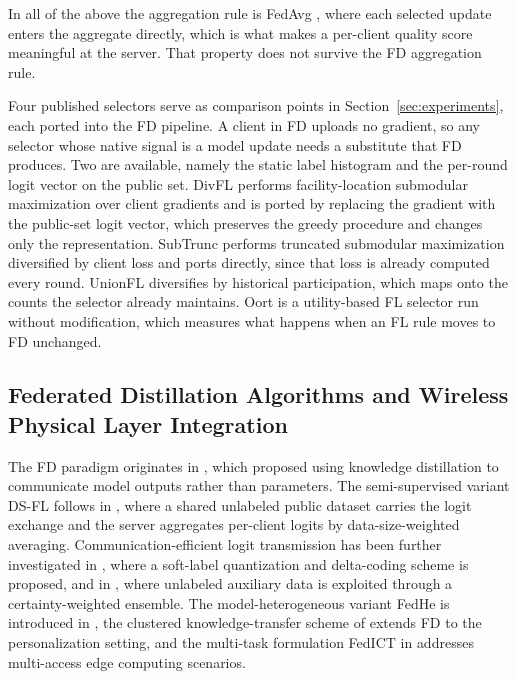 \documentclass[journal]{IEEEtran}
\newcommand{\rev}[1]{#1}
\begin{document}
In all of the above the aggregation rule is FedAvg \cite{mcmahan2017communication}, where each selected update enters the aggregate directly, which is what makes a per-client quality score meaningful at the server. That property does not survive the FD aggregation rule.

\rev{Four published selectors serve as comparison points in Section~\ref{sec:experiments}, each ported into the FD pipeline. A client in FD uploads no gradient, so any selector whose native signal is a model update needs a substitute that FD produces. Two are available, namely the static label histogram and the per-round logit vector on the public set. DivFL \cite{balakrishnan2022divfl} performs facility-location submodular maximization over client gradients and is ported by replacing the gradient with the public-set logit vector, which preserves the greedy procedure and changes only the representation. SubTrunc \cite{castillo2024subtrunc} performs truncated submodular maximization diversified by client loss and ports directly, since that loss is already computed every round. UnionFL \cite{castillo2024unionfl} diversifies by historical participation, which maps onto the counts the selector already maintains. Oort \cite{lai2021oort} is a utility-based FL selector run without modification, which measures what happens when an FL rule moves to FD unchanged.}

\subsection{Federated Distillation Algorithms and Wireless Physical Layer Integration}
\label{ssec:rw-fd}

The FD paradigm originates in \cite{jeong2018communication}, which proposed using knowledge distillation \cite{hinton2015distilling} to communicate model outputs rather than parameters. The semi-supervised variant DS-FL follows in \cite{itahara2023distillation}, where a shared unlabeled public dataset carries the logit exchange and the server aggregates per-client logits by data-size-weighted averaging. Communication-efficient logit transmission has been further investigated in \cite{sattler2022cfd}, where a soft-label quantization and delta-coding scheme is proposed, and in \cite{sattler2023fedaux}, where unlabeled auxiliary data is exploited through a certainty-weighted ensemble. The model-heterogeneous variant FedHe is introduced in \cite{chan2021fedhe}, the clustered knowledge-transfer scheme of \cite{cho2023clustered} extends FD to the personalization setting, and the multi-task formulation FedICT in \cite{wu2024fedict} addresses multi-access edge computing scenarios.
\end{document}
